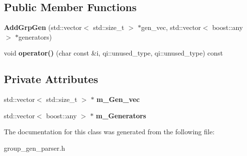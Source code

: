 \subsection*{Public Member Functions}
\begin{DoxyCompactItemize}
\item 
\hypertarget{classengine_1_1cParamGrpGenParser_1_1AddGrpGen_a3159145eb4605d9c95b0485dc5d98820}{{\bfseries Add\-Grp\-Gen} (std\-::vector$<$ std\-::size\-\_\-t $>$ $\ast$gen\-\_\-vec, std\-::vector$<$ boost\-::any $>$ $\ast$generators)}\label{classengine_1_1cParamGrpGenParser_1_1AddGrpGen_a3159145eb4605d9c95b0485dc5d98820}

\item 
\hypertarget{classengine_1_1cParamGrpGenParser_1_1AddGrpGen_ad2a6ded93b96690296f31f5b13ed04ee}{void {\bfseries operator()} (char const \&i, qi\-::unused\-\_\-type, qi\-::unused\-\_\-type) const }\label{classengine_1_1cParamGrpGenParser_1_1AddGrpGen_ad2a6ded93b96690296f31f5b13ed04ee}

\end{DoxyCompactItemize}
\subsection*{Private Attributes}
\begin{DoxyCompactItemize}
\item 
\hypertarget{classengine_1_1cParamGrpGenParser_1_1AddGrpGen_ad7d8dd9a7866fca6000d791c50c205bb}{std\-::vector$<$ std\-::size\-\_\-t $>$ $\ast$ {\bfseries m\-\_\-\-Gen\-\_\-vec}}\label{classengine_1_1cParamGrpGenParser_1_1AddGrpGen_ad7d8dd9a7866fca6000d791c50c205bb}

\item 
\hypertarget{classengine_1_1cParamGrpGenParser_1_1AddGrpGen_a21539d542713e53a888967d176922b9a}{std\-::vector$<$ boost\-::any $>$ $\ast$ {\bfseries m\-\_\-\-Generators}}\label{classengine_1_1cParamGrpGenParser_1_1AddGrpGen_a21539d542713e53a888967d176922b9a}

\end{DoxyCompactItemize}


The documentation for this class was generated from the following file\-:\begin{DoxyCompactItemize}
\item 
group\-\_\-gen\-\_\-parser.\-h\end{DoxyCompactItemize}
